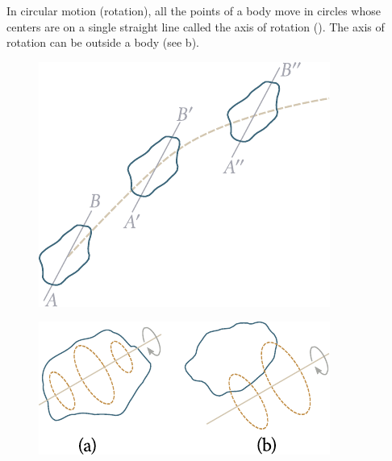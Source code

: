 In circular motion (rotation), all the points of a body move in circles whose centers are on a single straight line called the axis of rotation (). The axis of rotation can be outside a body (see b).

\begin{figure}[t]
	\begin{minipage}[t]{0.5\linewidth}
		\begin{center}
			\includegraphics[scale=0.95]{figures/ch_01/fig_1_1.pdf}
			\caption[]{}
			\label{fig:1_1}
		\end{center}
	\end{minipage}
	\hfill{ }%
	\begin{minipage}[t]{0.5\linewidth}
		\begin{center}
			\includegraphics[scale=0.95]{figures/ch_01/fig_1_2.pdf}
			\caption[]{}
			\label{fig:1_2}
		\end{center}
	\end{minipage}
\end{figure}

